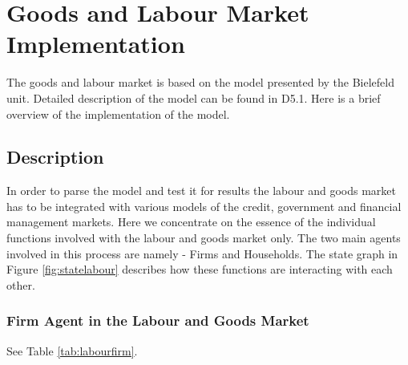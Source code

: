 \section{Goods and Labour Market Implementation}
The goods and labour market is based on the model presented by the
Bielefeld unit. Detailed description of the model can be found in
D5.1. Here is a brief overview of the implementation of the model.
\subsection{Description}
In order to parse the model and test it for results the labour and
goods market has to be integrated with various models of the credit,
government and financial management markets. Here we concentrate on
the essence of the individual functions involved with the labour and
goods market only. The two main agents involved in this process are
namely - Firms and Households. The state graph in Figure
\ref{fig:statelabour} describes how these functions are interacting
with each other.

\subsubsection{Firm Agent in the Labour and Goods Market}

See Table \ref{tab:labourfirm}.

